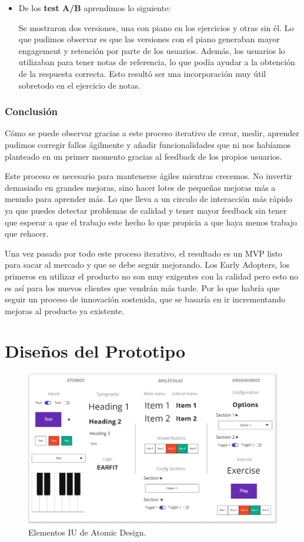 \documentclass[12pt,twoside,titlepage]{report}
\begin{document}
{\begin{itemize}
    \item De los \textbf{test A/B} aprendimos lo siguiente:
    
    Se mostraron dos versiones, una con piano en los ejercicios y otras sin él. Lo que pudimos observar es que las versiones con el piano generaban mayor engagement y retención por parte de los usuarios. Además, los usuarios lo utilizaban para tener notas de referencia, lo que podía ayudar a la obtención de la respuesta correcta. Esto resultó ser una incorporación muy útil sobretodo en el ejercicio de notas.
\end{itemize}


\subsection{Conclusión}
Cómo se puede observar gracias a este proceso iterativo de crear, medir, aprender pudimos corregir fallos ágilmente y añadir funcionalidades que ni nos habíamos planteado en un primer momento gracias al feedback de los propios usuarios.

Este proceso es necesario para mantenerse ágiles mientras crecemos. No invertir demasiado en grandes mejoras, sino hacer lotes de pequeñas mejoras más a menudo para aprender más. Lo que lleva a un circulo de interacción más rápido ya que puedes detectar problemas de calidad y tener mayor feedback sin tener que esperar a que el trabajo este hecho lo que propicia a que haya menos trabajo que rehacer.

Una vez pasado por todo este proceso iterativo, el resultado es un MVP listo para sacar al mercado y que se debe seguir mejorando. 
Los Early Adopters, los primeros en utilizar el producto no son muy exigentes con la calidad pero esto no es así para los nuevos clientes que vendrán más tarde. 
Por lo que habría que seguir un proceso de innovación sostenida, que se basaría en ir incrementando mejoras al producto ya existente.

\chapter{Diseños del Prototipo}

\begin{figure}[H]
    \centering
    \includegraphics[scale=0.2]{Design Thinking/Prototipo/AtomicDesign}
    \caption{Elementos IU de Atomic Design.}
    \label{fig:AtomicDesign}
\end{figure}

}
\end{document}
